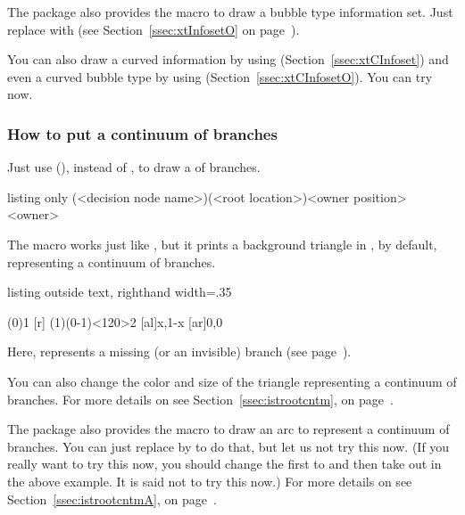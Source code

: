 The package also provides the macro \cmd{\xtInfosetO} to draw a bubble type information set.
Just replace \cmd{\xtInfoset} with \cmd{\xtInfosetO} (see Section~\ref{ssec:xtInfosetO} on page~\pageref{ssec:xtInfosetO}).

You can also draw a curved information by using \cmd{\xtCInfoset} (Section~\ref{ssec:xtCInfoset}) and even a curved bubble type by using \cmd{\xtCInfosetO} (Section~\ref{ssec:xtCInfosetO}). You can try now.


\subsubsection{How to put a continuum of branches}

Just use \cmd{\istrootcntm} (), instead of \cmd{\istroot}, to draw a  of branches.

\begin{tcblisting}{listing only}
\istrootcntm(<decision node name>)(<root location>)<owner position>{<owner>}
\end{tcblisting}

The macro \icmd{\istrootcntm} works just like \cmd{\istroot}, but it prints a background triangle in , by default, representing a continuum of branches.

\begin{tcblisting}{listing outside text, righthand width=.35\linewidth}
\begin{istgame}[font=\scriptsize]
\istrootcntm(0){1} 
  [r] \istbm \endist
\xtdistance{10mm}{20mm}
\istroot(1)(0-1)<120>{2}
  [al]{x,1-x} [ar]{0,0} \endist
\end{istgame}
\end{tcblisting}

Here, \cmd{\istbm} represents a missing (or an invisible) branch (see page~\pageref{page:istbm}).

You can also change the color and size of the triangle representing a continuum of branches. 
For more details on \cmd{\istrootcntm} see Section~\ref{ssec:istrootcntm}, on page~\pageref{ssec:istrootcntm}.

The package also provides the macro \cmd{\istrootcntmA} to draw an arc to represent a continuum of branches.
You can just replace \cmd{\istrootcntm} by \cmd{\istrootcntmA} to do that, but let us not try this now. 
(If you really want to try this now, you should change the first \cmd{\istb} to \cmd{\istbA} and then take out \cmd{\istbm} in the above example. It is said not to try this now.)
For more details on \cmd{\istrootcntmA} see Section~\ref{ssec:istrootcntmA}, on page~\pageref{ssec:istrootcntmA}.

